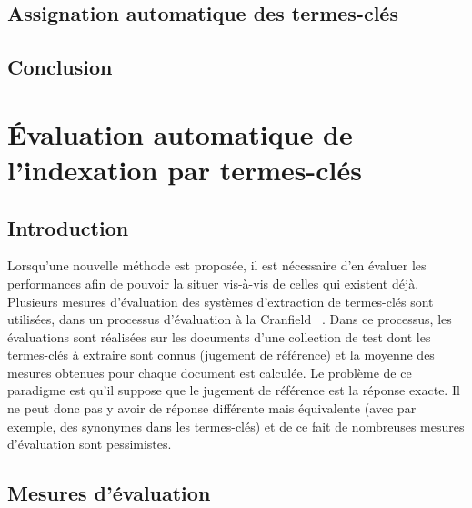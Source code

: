     \section{Assignation automatique des termes-clés}
    \label{sec:main-state_of_the_art-automatic_keyphrase_extraction-automatic_keyphrase_assignment}

    \section{Conclusion}
    \label{sec:main-state_of_the_art-automatic_keyphrase_extraction-conclusion}


    \chapter{Évaluation automatique de l'indexation par termes-clés }
  \label{chap:main-state_of_the_art-automatic_evaluation_of_keyphrase_annotation}
    \section{Introduction}
    \label{sec:main-state_of_the_art-automatic_evaluation_of_keyphrase_annotation-introduction}
      Lorsqu'une nouvelle méthode est proposée, il est nécessaire d'en évaluer
      les performances afin de pouvoir la situer vis-à-vis de celles qui
      existent déjà. Plusieurs mesures d'évaluation des systèmes d'extraction de
      termes-clés sont utilisées, dans un processus d'évaluation \og à la
      Cranfield \fg \ \citep{voorhees2002philosophy}. Dans ce processus, les
      évaluations sont réalisées sur les documents d'une collection de test dont
      les termes-clés à extraire sont connus (jugement de référence) et la
      moyenne des mesures obtenues pour chaque document est calculée. Le
      problème de ce paradigme est qu'il suppose que le jugement de référence
      est la réponse exacte. Il ne peut donc pas y avoir de réponse différente
      mais équivalente (avec par exemple, des synonymes dans les termes-clés) et
      de ce fait de nombreuses mesures d'évaluation sont pessimistes.
      

    \section{Mesures d'évaluation}
    \label{sec:main-state_of_the_art-automatic_evaluation_of_keyphrase_annotation-evaluation_measures}
